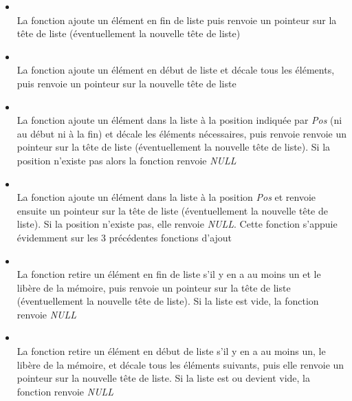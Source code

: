 \documentclass[11pt,a4paper]{article}
\begin{document}
\begin{itemize}
%
\item {}\\
      La fonction ajoute un élément en fin de liste puis renvoie un pointeur sur la tête de liste (éventuellement la nouvelle tête de liste)
\item {}\\
      La fonction ajoute un élément en début de liste et décale tous les éléments, puis renvoie un pointeur sur la nouvelle tête de liste
\item {}\\
      La fonction ajoute un élément dans la liste à la position indiquée par \textit{Pos} (ni au début ni à la fin) et décale les éléments nécessaires, puis renvoie renvoie un pointeur sur la tête de liste (éventuellement la nouvelle tête de liste). Si la position n'existe pas alors la fonction renvoie \textit{NULL}
\item {}\\
      La fonction ajoute un élément dans la liste à la position \textit{Pos} et renvoie ensuite un pointeur sur la tête de liste (éventuellement la nouvelle tête de liste). Si la position n'existe pas, elle renvoie \textit{NULL}. Cette fonction s'appuie évidemment sur les 3 précédentes fonctions d'ajout
%
\item {}\\
      La fonction retire un élément en fin de liste s'il y en a au moins un et le libère de la mémoire, puis renvoie un pointeur sur la tête de liste (éventuellement la nouvelle tête de liste). Si la liste est vide, la fonction renvoie \textit{NULL}
\item {}\\
      La fonction retire un élément en début de liste s'il y en a au moins un, le libère de la mémoire, et décale tous les éléments suivants, puis elle renvoie un pointeur sur la nouvelle tête de liste. Si la liste est ou devient vide, la fonction renvoie \textit{NULL}

\end{itemize}
\end{document}
